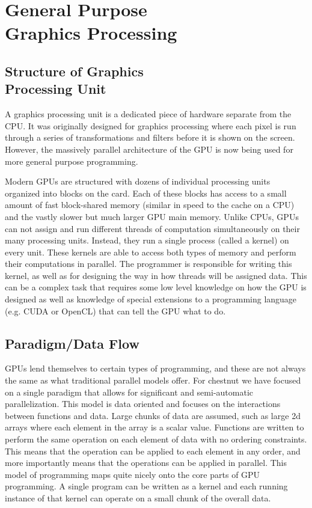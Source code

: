 \documentclass[twocolumn]{article}
\renewcommand{\|}{\origbar} %
\begin{document}
\section{General Purpose \\ Graphics Processing}

\subsection{Structure of Graphics \\ Processing Unit}

A graphics processing unit is a dedicated piece of hardware separate from the CPU. It was originally designed for graphics processing where each pixel is run through a series of transformations and filters before it is shown on the screen. However, the massively parallel architecture of the GPU is now being used for more general purpose programming. 

Modern GPUs are structured with dozens of individual processing units organized into blocks on the card. Each of these blocks has access to a small amount of fast block-shared memory (similar in speed to the cache on a CPU) and the vastly slower but much larger GPU main memory. Unlike CPUs, GPUs can not assign and run different threads of computation simultaneously on their many processing units. Instead, they run a single process (called a kernel) on every unit. These kernels are able to access both types of memory and perform their computations in parallel. The programmer is responsible for writing this kernel, as well as for designing the way in how threads will be assigned data. This can be a complex task that requires some low level knowledge on how the GPU is designed as well as knowledge of special extensions to a programming language (e.g. CUDA or OpenCL) that can tell the GPU what to do.

\subsection{Paradigm/Data Flow}

GPUs lend themselves to certain types of programming, and these are not always the same as what traditional parallel models offer. For chestnut we have focused on a single paradigm that allows for significant and semi-automatic parallelization. This model is data oriented and focuses on the interactions between functions and data. Large chunks of data are assumed, such as large 2d arrays where each element in the array is a scalar value. Functions are written to perform the same operation on each element of data with no ordering constraints. This means that the operation can be applied to each element in any order, and more importantly means that the operations can be applied in parallel. This model of programming maps quite nicely onto the core parts of GPU programming. A single program can be written as a kernel and each running instance of that kernel can operate on a small chunk of the overall data.
\end{document}

